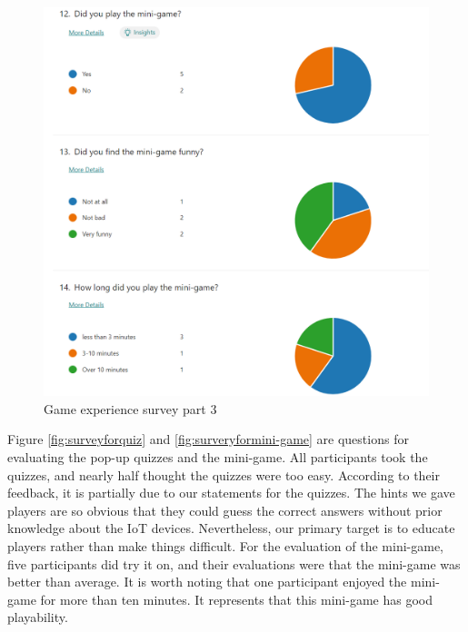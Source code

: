 \documentclass[msc,deptreport,ai]{infthesis}      %
\begin{document}
\begin{figure}[htbp]
{\begin{minipage}[c]{0.485\textwidth}
\includegraphics[width=1\textwidth]{Survey6.png}
\end{minipage}
}\hspace{-1pt}%
\caption{Game experience survey part 3}
\label{fig:surveyPart3}
\end{figure}

Figure \ref{fig:surveyforquiz} and \ref{fig:surveryformini-game} are questions for evaluating the pop-up quizzes and the mini-game. All participants took the quizzes, and nearly half thought the quizzes were too easy. According to their feedback, it is partially due to our statements for the quizzes. The hints we gave players are so obvious that they could guess the correct answers without prior knowledge about the IoT devices. Nevertheless, our primary target is to educate players rather than make things difficult. For the evaluation of the mini-game, five participants did try it on, and their evaluations were that the mini-game was better than average. It is worth noting that one participant enjoyed the mini-game for more than ten minutes. It represents that this mini-game has good playability.
\end{document}
